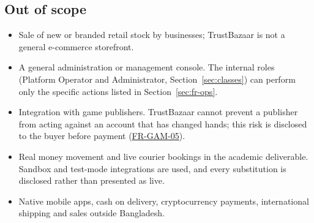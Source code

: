 \documentclass[11pt,a4paper]{report}
\newcommand{\rr}[1]{\hyperlink{#1}{#1}}
\begin{document}
\subsection*{Out of scope}
\begin{itemize}[nosep]
    \item Sale of new or branded retail stock by businesses; TrustBazaar is not a general e-commerce storefront.
    \item A general administration or management console. The internal roles (Platform Operator and Administrator, Section~\ref{sec:classes}) can perform only the specific actions listed in Section~\ref{sec:fr-ops}.
    \item Integration with game publishers. TrustBazaar cannot prevent a publisher from acting against an account that has changed hands; this risk is disclosed to the buyer before payment (\rr{FR-GAM-05}).
    \item Real money movement and live courier bookings in the academic deliverable. Sandbox and test-mode integrations are used, and every substitution is disclosed rather than presented as live.
    \item Native mobile apps, cash on delivery, cryptocurrency payments, international shipping and sales outside Bangladesh.
\end{itemize}
\end{document}
